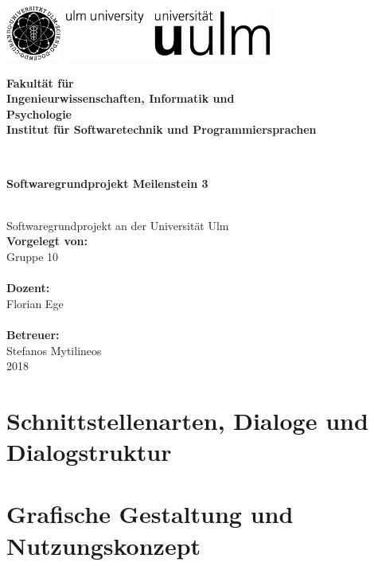\documentclass[a4paper,12pt,
headsepline,           %
oneside,               %
pointlessnumbers,      %
bibtotoc,              %
]{scrartcl}
\newcommand{\fullname}{Gruppe 10}
\newcommand{\titel}{Softwaregrundprojekt Meilenstein 3}
\newcommand{\jahr}{2018}
\newcommand{\dozent}{Florian Ege}
\newcommand{\betreuer}{Stefanos Mytilineos}
\newcommand{\fakultaet}{Ingenieurwissenschaften, Informatik und\\Psychologie}
\newcommand{\institut}{Institut für Softwaretechnik und Programmiersprachen}
\begin{document}
    \thispagestyle{empty}
    \begin{addmargin*}[4mm]{-10mm}

        \includegraphics[height=1.8cm]{images/unilogo_bild}
        \hfill
        \includegraphics[height=1.8cm]{images/unilogo_wort}\\[1em]

        {\footnotesize
        \hspace*{115mm}\parbox[t]{35mm}{\bfseries Fakultät für\\
        \fakultaet\\
        \mdseries \institut}\\[2cm]

        \parbox{140mm}{\bfseries \LARGE \titel}\\[2.5em]
        {\footnotesize Softwaregrundprojekt an der Universität Ulm}\\[3em]

        {\footnotesize \bfseries Vorgelegt von:}\\
        {\footnotesize \fullname\\}\\ [1em]
        {\footnotesize \bfseries Dozent:}\\
        {\footnotesize \dozent\\}\\[1em]
        {\footnotesize \bfseries Betreuer:}\\
        {\footnotesize \betreuer}\\ [1em]
        {\footnotesize \jahr}
        }
    \end{addmargin*}
    \pagebreak
    \tableofcontents
    \pagebreak
  
    \section{Schnittstellenarten, Dialoge und Dialogstruktur}
    
	\section{Grafische Gestaltung und Nutzungskonzept}
    	
    
\end{document}
